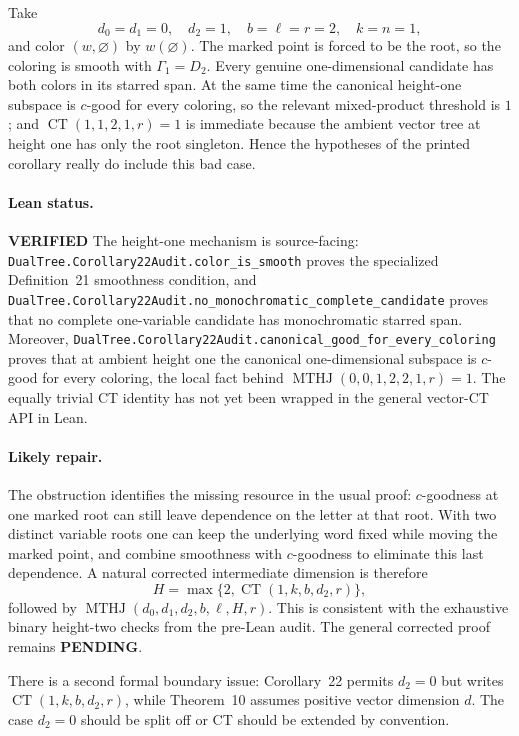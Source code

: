 \documentclass[11pt]{article}
\newcommand{\ok}{\textcolor{green!40!black}{\textbf{VERIFIED}}}
\newcommand{\todo}{\textcolor{gray!70!black}{\textbf{PENDING}}}
\newcommand{\lean}[1]{\texttt{#1}}
\begin{document}
Take
\[
d_0=d_1=0,\quad d_2=1,\quad b=\ell=r=2,\quad k=n=1,
\]
and color $(w,\varnothing)$ by $w(\varnothing)$.  The marked point is forced
to be the root, so the coloring is smooth with $\Gamma_1=D_2$.  Every genuine
one-dimensional candidate has both colors in its starred span.  At the same
time the canonical height-one subspace is $c$-good for every coloring, so the
relevant mixed-product threshold is $1$; and
$\operatorname{CT}(1,1,2,1,r)=1$ is immediate because the ambient vector tree
at height one has only the root singleton.  Hence the hypotheses of the
printed corollary really do include this bad case.

\paragraph{Lean status.} \ok
The height-one mechanism is source-facing:
\lean{DualTree.Corollary22Audit.color_is_smooth} proves the specialized
Definition~21 smoothness condition, and
\lean{DualTree.Corollary22Audit.no_monochromatic_complete_candidate} proves
that no complete one-variable candidate has monochromatic starred span.
Moreover,
\lean{DualTree.Corollary22Audit.canonical_good_for_every_coloring}
proves that at ambient height one the canonical one-dimensional subspace is
$c$-good for every coloring, the local fact behind
$\operatorname{MTHJ}(0,0,1,2,2,1,r)=1$.  The equally trivial CT identity has
not yet been wrapped in the general vector-CT API in Lean.

\paragraph{Likely repair.}
The obstruction identifies the missing resource in the usual proof:
$c$-goodness at one marked root can still leave dependence on the letter at
that root.  With two distinct variable roots one can keep the underlying word
fixed while moving the marked point, and combine smoothness with $c$-goodness
to eliminate this last dependence.  A natural corrected intermediate
dimension is therefore
\[
H=\max\{2,\operatorname{CT}(1,k,b,d_2,r)\},
\]
followed by
$\operatorname{MTHJ}(d_0,d_1,d_2,b,\ell,H,r)$.
This is consistent with the exhaustive binary height-two checks from the
pre-Lean audit.  The general corrected proof remains \todo.

There is a second formal boundary issue: Corollary~22 permits $d_2=0$ but
writes $\operatorname{CT}(1,k,b,d_2,r)$, while Theorem~10 assumes positive
vector dimension $d$.  The case $d_2=0$ should be split off or CT should be
extended by convention.
\end{document}
